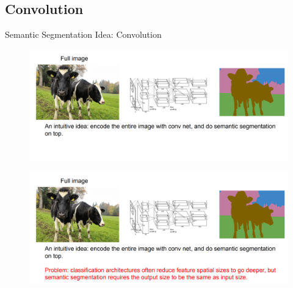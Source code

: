 \subsection{Convolution}

\begin{frame}[allowframebreaks]{Semantic Segmentation Idea: Convolution}
\begin{figure}
\centering
\includegraphics[width=1.0\textwidth,height=1.0\textheight,keepaspectratio]{images/segmentation/sem_5.png}
\end{figure}

\framebreak

\begin{figure}
\centering
\includegraphics[width=1.0\textwidth,height=1.0\textheight,keepaspectratio]{images/segmentation/sem_6.png}
\end{figure}
    
\end{frame}

